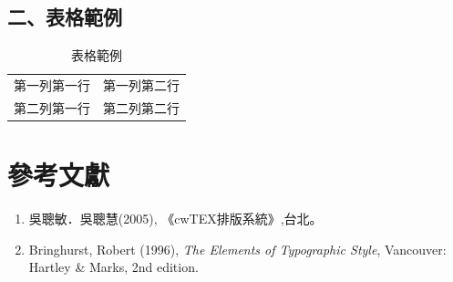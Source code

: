 \documentclass[12pt,oneside,openany,a4paper]{book}
\begin{document}
\section{二、表格範例}
\begin{table}[h]
    \caption{表格範例}
    \begin{center}
        \begin{tabular}{|c|c|}
        \hline
        第一列第一行 & 第一列第二行 \\
        第二列第一行 & 第二列第二行 \\
        \hline
        \end{tabular}
    \end{center}
\end{table}

\backmatter
\chapter{參考文獻}
\renewcommand{\labelenumi}{[\arabic{enumi}]}
\begin{enumerate}
    \item 吳聰敏．吳聰慧(2005), 《cwTEX排版系統》,台北。
    \item Bringhurst, Robert (1996), {\it The Elements of Typographic Style}, Vancouver: Hartley \& Marks, 2nd edition.
\end{enumerate}

\appendix
\end{document}
